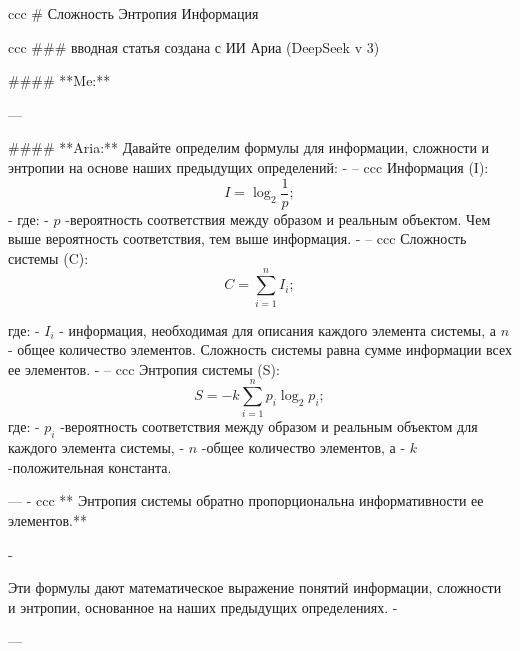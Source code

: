 
ccc #  Сложность Энтропия Информация

ccc ### вводная статья создана с ИИ Ариа (DeepSeek v 3)

#### **Me:** 

---

#### **Aria:**
Давайте определим формулы для информации, сложности и энтропии на основе наших предыдущих определений:
-  
-- ccc Информация (I): 
\[I = \log_2 \frac{1}{p};\]  
-  где:
-   \(p\) -вероятность соответствия между образом и реальным объектом. Чем выше вероятность соответствия, тем выше информация. 
-  
-- ccc Сложность системы (C): \[C = \sum_{i=1}^{n} I_i; \]  

где: 
-  \(I_i\) - информация, необходимая для описания каждого элемента системы, а \(n\) - общее количество элементов. Сложность системы равна сумме информации всех ее элементов.
-  
-- ccc Энтропия системы (S):
\[S = -k \sum_{i=1}^{n} p_i \log_2 p_i;\]
 где:
-  \(p_i\) -вероятность соответствия между образом и реальным объектом для каждого элемента системы, 
-   \(n\) -общее количество элементов, а 
-   \(k\) -положительная константа. 

---
-  ccc **  Энтропия системы обратно пропорциональна информативности ее элементов.**

-  

Эти формулы дают математическое выражение понятий информации, сложности и энтропии, основанное на наших предыдущих определениях.
-  

--- 
